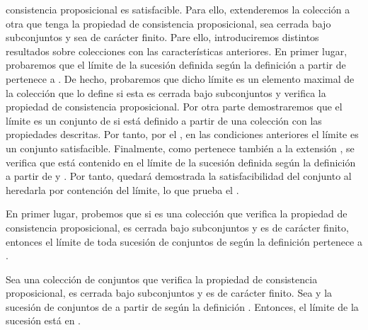 \begin{isabellebody}
\begin{isamarkuptext}
  consistencia proposicional es satisfacible. Para ello, extenderemos la colección  a otra  
  que tenga la propiedad de consistencia proposicional, sea cerrada bajo subconjuntos y sea de 
  carácter finito. Pare ello, introduciremos distintos resultados sobre colecciones  con 
  las características anteriores. En primer lugar, probaremos que el límite de la sucesión definida
  según la definición  a partir de  pertenece a . De hecho, probaremos que 
  dicho límite es un elemento maximal de la colección que lo define si esta es cerrada bajo 
  subconjuntos y verifica la propiedad de consistencia proposicional. Por otra parte demostraremos 
  que el límite es un conjunto de  si está definido a partir de una colección  con las 
  propiedades descritas. Por tanto, por el , en las condiciones anteriores el 
  límite es un conjunto satisfacible. Finalmente, como  pertenece también a la extensión 
  , se verifica que está contenido en el límite de la sucesión definida según la definición 
   a partir de  y . Por tanto, quedará demostrada la satisfacibilidad del 
  conjunto  al heredarla por contención del límite, lo que prueba el .

  En primer lugar, probemos que si  es una colección que verifica la propiedad de 
  consistencia proposicional, es cerrada bajo subconjuntos y es de carácter finito, entonces el 
  límite de toda sucesión de conjuntos de  según la definición  pertenece a .

  \begin{lema}
    Sea  una colección de conjuntos que verifica la propiedad de consistencia proposicional, es 
    cerrada bajo subconjuntos y es de carácter finito. Sea  y  la sucesión de conjuntos
    de  a partir de  según la definición . Entonces, el límite de la sucesión está en
    .
  \end{lema}


\end{isamarkuptext}
\end{isabellebody}
